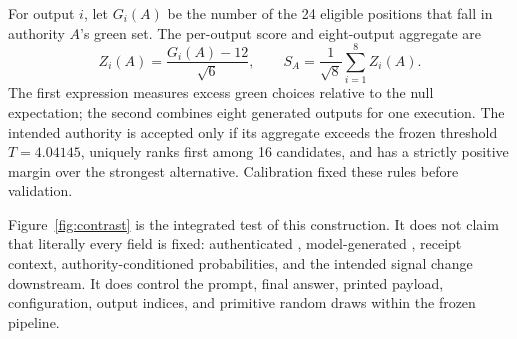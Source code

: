 For output $i$, let $G_i(A)$ be the number of the 24 eligible positions that
fall in authority $A$'s green set. The per-output score and eight-output
aggregate are
\begin{equation}
Z_i(A)=\frac{G_i(A)-12}{\sqrt{6}},\qquad
S_A=\frac{1}{\sqrt{8}}\sum_{i=1}^{8}Z_i(A).
\end{equation}
The first expression measures excess green choices relative to the null
expectation; the second combines eight generated outputs for one execution.
The intended authority is accepted only if its aggregate exceeds the frozen
threshold $T=4.04145$, uniquely ranks first among 16 candidates, and has a
strictly positive margin over the strongest alternative. Calibration fixed
these rules before validation.

Figure~\ref{fig:contrast} is the integrated test of this construction. It does
not claim that literally every field is fixed: authenticated \ztwo{},
model-generated \zthree{}, receipt context, authority-conditioned
probabilities, and the intended signal change downstream. It does control the
prompt, final answer, printed payload, configuration, output indices, and
primitive random draws within the frozen pipeline.
